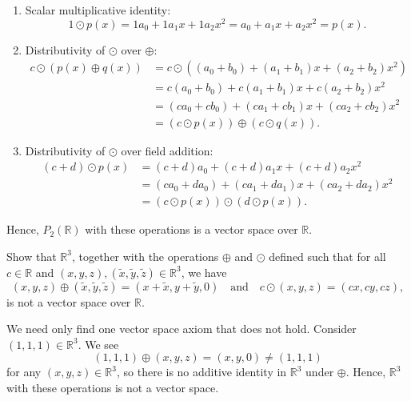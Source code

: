 \begin{sltn}
\begin{enumerate}
    \item Scalar multiplicative identity:
    \begin{equation*}
        1\odot p(x)=1a_0+1a_1x+1a_2x^2=a_0+a_1x+a_2x^2=p(x).
    \end{equation*}

    \item Distributivity of $ \odot $ over $ \oplus $:
    \begin{align*}
        c\odot(p(x)\oplus q(x)) &= c\odot((a_0+b_0)+(a_1+b_1)x+(a_2+b_2)x^2) \\
        &= c(a_0+b_0)+c(a_1+b_1)x+c(a_2+b_2)x^2 \\
        &= (ca_0+cb_0)+(ca_1+cb_1)x+(ca_2+cb_2)x^2 \\
        &= (c\odot p(x))\oplus(c\odot q(x)).
    \end{align*}

    \item Distributivity of $ \odot $ over field addition:
    \begin{align*}
        (c+d)\odot p(x) &= (c+d)a_0+(c+d)a_1x+(c+d)a_2x^2 \\
        &= (ca_0+da_0)+(ca_1+da_1)x+(ca_2+da_2)x^2 \\
        &= (c\odot p(x))\odot(d\odot p(x)).
    \end{align*}
\end{enumerate}
Hence, $ P_2(\mathbb{R}) $ with these operations is a vector space over $ \mathbb{R} $.
\end{sltn}

\begin{exmp}
Show that $ \mathbb{R}^3 $, together with the operations $ \oplus $ and $ \odot $ defined such that for all $ c\in\mathbb{R} $ and $ (x,y,z),(\tilde{x},\tilde{y},\tilde{z})\in\mathbb{R}^3 $, we have
\begin{equation*}
    (x,y,z)\oplus(\tilde{x},\tilde{y},\tilde{z})=(x+\tilde{x},y+\tilde{y},0) \quad\text{and}\quad c\odot(x,y,z)=(cx,cy,cz),
\end{equation*}
is not a vector space over $ \mathbb{R} $.
\end{exmp}
\begin{sltn}
We need only find one vector space axiom that does not hold. Consider $ (1,1,1)\in\mathbb{R}^3 $. We see
\begin{equation*}
    (1,1,1)\oplus(x,y,z)=(x,y,0)\neq (1,1,1)
\end{equation*}
for any $ (x,y,z)\in\mathbb{R}^3 $, so there is no additive identity in $ \mathbb{R}^3 $ under $ \oplus $. Hence, $ \mathbb{R}^3 $ with these operations is not a vector space.
\end{sltn}


